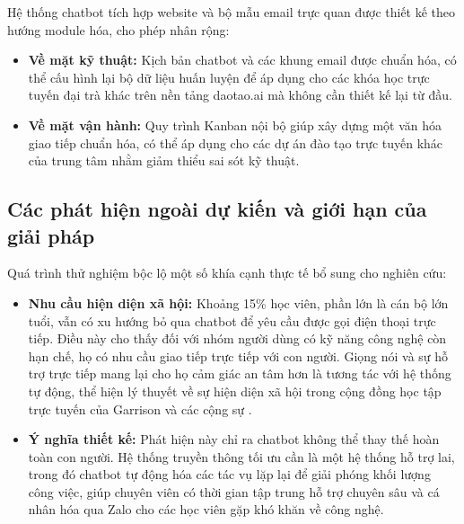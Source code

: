 Hệ thống chatbot tích hợp website và bộ mẫu email trực quan được thiết kế theo hướng module hóa, cho phép nhân rộng:
\begin{itemize}
    \item \textbf{Về mặt kỹ thuật:} Kịch bản chatbot và các khung email được chuẩn hóa, có thể cấu hình lại bộ dữ liệu huấn luyện để áp dụng cho các khóa học trực tuyến đại trà khác trên nền tảng daotao.ai mà không cần thiết kế lại từ đầu.
    \item \textbf{Về mặt vận hành:} Quy trình Kanban nội bộ giúp xây dựng một văn hóa giao tiếp chuẩn hóa, có thể áp dụng cho các dự án đào tạo trực tuyến khác của trung tâm nhằm giảm thiểu sai sót kỹ thuật.
\end{itemize}

\subsection{Các phát hiện ngoài dự kiến và giới hạn của giải pháp}

Quá trình thử nghiệm bộc lộ một số khía cạnh thực tế bổ sung cho nghiên cứu:
\begin{itemize}
    \item \textbf{Nhu cầu hiện diện xã hội:} Khoảng 15\% học viên, phần lớn là cán bộ lớn tuổi, vẫn có xu hướng bỏ qua chatbot để yêu cầu được gọi điện thoại trực tiếp. Điều này cho thấy đối với nhóm người dùng có kỹ năng công nghệ còn hạn chế, họ có nhu cầu giao tiếp trực tiếp với con người. Giọng nói và sự hỗ trợ trực tiếp mang lại cho họ cảm giác an tâm hơn là tương tác với hệ thống tự động, thể hiện lý thuyết về sự hiện diện xã hội trong cộng đồng học tập trực tuyến của Garrison và các cộng sự \parencite{garrison1999}.
    \item \textbf{Ý nghĩa thiết kế:} Phát hiện này chỉ ra chatbot không thể thay thế hoàn toàn con người. Hệ thống truyền thông tối ưu cần là một hệ thống hỗ trợ lai, trong đó chatbot tự động hóa các tác vụ lặp lại để giải phóng khối lượng công việc, giúp chuyên viên có thời gian tập trung hỗ trợ chuyên sâu và cá nhân hóa qua Zalo cho các học viên gặp khó khăn về công nghệ.
\end{itemize}

